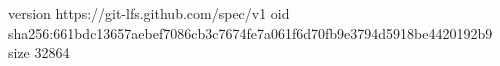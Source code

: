 version https://git-lfs.github.com/spec/v1
oid sha256:661bdc13657aebef7086cb3c7674fe7a061f6d70fb9e3794d5918be4420192b9
size 32864
